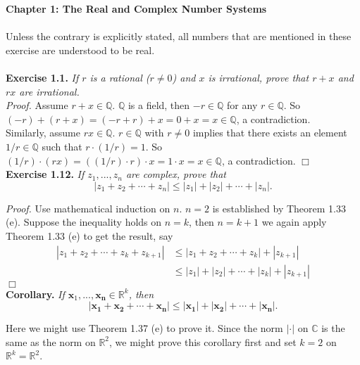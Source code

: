 \documentclass{article}
\begin{document}
\textbf{\Large Chapter 1: The Real and Complex Number Systems} \\\\



Unless the contrary is explicitly stated, all numbers that are mentioned in these exercise
are understood to be real. \\\\



\textbf{Exercise 1.1.}
\emph{If $r$ is a rational ($r \neq 0$) and $x$ is irrational,
prove that $r + x$ and $rx$ are irrational.} \\

\emph{Proof.}
Assume $r + x \in \mathbb{Q}$.
$\mathbb{Q}$ is a field, then $-r \in \mathbb{Q}$ for any $r \in \mathbb{Q}$.
So $(-r) + (r + x) = (-r + r) + x = 0 + x = x \in \mathbb{Q}$, a contradiction. \\

Similarly, assume $rx \in \mathbb{Q}$. $r \in \mathbb{Q}$ with $r \neq 0$ implies that
there exists an element $1/r \in \mathbb{Q}$ such that $r \cdot (1/r) = 1$.
So $(1/r) \cdot (rx) = ((1/r) \cdot r) \cdot x = 1 \cdot x = x \in \mathbb{Q}$, a contradiction.
$\Box$ \\



\textbf{Exercise 1.12.}
\emph{If $z_1, ..., z_n$ are complex, prove that
$$|z_1 + z_2 + \cdots + z_n| \leq |z_1| + |z_2| + \cdots + |z_n|.$$}

\emph{Proof.}
Use mathematical induction on $n$. $n = 2$ is established by Theorem 1.33 (e).
Suppose the inequality holds on $n = k$, then $n = k + 1$ we again apply Theorem 1.33 (e)
to get the result, say
\begin{align*}
|z_1 + z_2 + \cdots + z_k + z_{k+1}|
&\leq |z_1 + z_2 + \cdots + z_k| + |z_{k+1}| \\
&\leq |z_1| + |z_2| + \cdots + |z_k| + |z_{k+1}|
\end{align*}
$\Box$ \\

\textbf{Corollary.}
\emph{If $\mathbf{x}_1, ..., \mathbf{x_n} \in \mathbb{R}^k$, then
$$|\mathbf{x_1} + \mathbf{x_2} + \cdots + \mathbf{x_n}|
\leq |\mathbf{x_1}| + |\mathbf{x_2}| + \cdots + |\mathbf{x_n}|.$$}

Here we might use Theorem 1.37 (e) to prove it.
Since the norm $|\cdot|$ on $\mathbb{C}$ is the same as the norm on $\mathbb{R}^2$,
we might prove this corollary first and set $k = 2$ on $\mathbb{R}^k = \mathbb{R}^2$.
\end{document}
